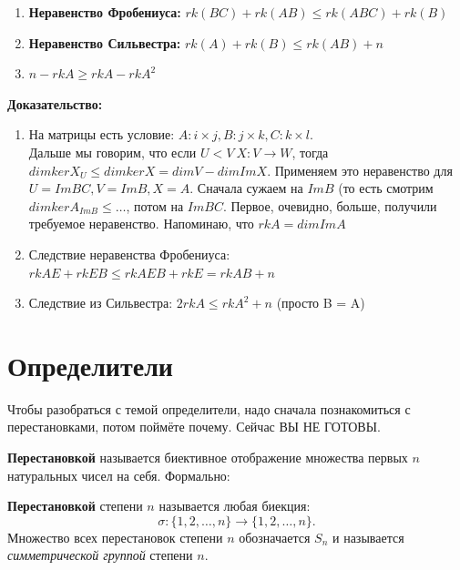 \documentclass[12pt]{article}
\begin{document}
\begin{theorembox}
    \begin{enumerate}
        \item \textbf{Неравенство Фробениуса:} $rk(BC) + rk(AB) \leq rk(ABC) + rk(B)$
        \item \textbf{Неравенство Сильвестра:} $rk(A) + rk(B) \leq rk(AB) + n$
        \item $n - rkA \geq rkA - rkA^2$
    \end{enumerate}
    
    \textbf{Доказательство:}

    \begin{enumerate}
        \item На матрицы есть условие: $A: i \times j, B: j \times k, C: k \times l$.\\

        Дальше мы говорим, что если $U  < V \ X: V \rightarrow W$, тогда $dimkerX_U \leq dimkerX = dimV - dimImX$. Применяем это неравенство для $U = ImBC, V = ImB, X = A$. Сначала сужаем на $ImB$ (то есть смотрим $dimkerA_{ImB} \leq \dots$, потом на $ImBC$. Первое, очевидно, больше, получили требуемое неравенство. Напоминаю, что $rkA = dimImA$
        \item Следствие неравенства Фробениуса: $rkAE + rkEB \leq rkAEB + rkE = rkAB + n$
        \item Следствие из Сильвестра: $2rkA \leq rkA^2 + n$ (просто B = A)
    \end{enumerate}
    
\end{theorembox}

\section{Определители}

Чтобы разобраться с темой определители, надо сначала познакомиться с перестановками, потом поймёте почему. Сейчас ВЫ НЕ ГОТОВЫ.\\

\begin{definitionbox}
    \textbf{Перестановкой} называется биективное отображение множества первых \( n \) натуральных чисел на себя. Формально:


    \textbf{Перестановкой} степени \( n \) называется любая биекция:
    \[
    \sigma \colon \{1, 2, \dots, n\} \to \{1, 2, \dots, n\}.
    \]
    Множество всех перестановок степени \( n \) обозначается \( S_n \) и называется \textit{симметрической группой} степени \( n \).
\end{definitionbox}
\end{document}
